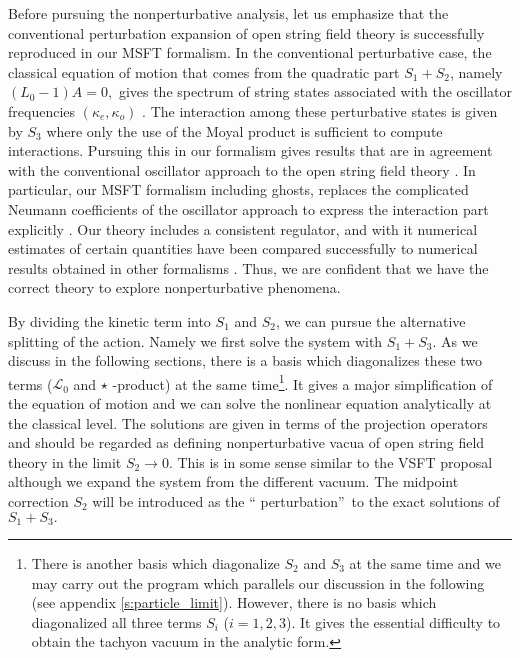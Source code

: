 \documentclass[a4paper,aps,preprint,nofootinbib,eqsecnum]{revtex4}
\begin{document}
Before pursuing the nonperturbative analysis, let us emphasize that the
conventional perturbation expansion of open string field theory is
successfully reproduced in our MSFT formalism. In the conventional
perturbative case, the classical equation of motion that comes from the
quadratic part $S_{1}+S_{2}$, namely $\left( L_{0}-1\right) A=0,$ gives the
spectrum of string states associated with the oscillator frequencies $%
(\kappa _{e},\kappa _{o})$ \cite{BM2}\cite{BKM1}. The interaction among
these perturbative states is given by $S_{3}$ where only the use of the
Moyal product is sufficient to compute interactions. Pursuing this in our
formalism gives results that are in agreement with the conventional
oscillator approach to the open string field theory \cite{GJ}. In
particular, our MSFT formalism including ghosts, replaces the complicated
Neumann coefficients of the oscillator approach to express the interaction
part explicitly \cite{BM2}\cite{PREP}. Our theory includes a consistent
regulator, and with it numerical estimates of certain quantities have been
compared successfully to numerical results obtained in other formalisms \cite%
{PREP}. Thus, we are confident that we have the correct theory to explore
nonperturbative phenomena.

By dividing the kinetic term into $S_{1}$ and $S_{2}$, we can pursue the
alternative splitting of the action. Namely we first solve the system with $%
S_{1}+S_{3}$. As we discuss in the following sections, there is a basis
which diagonalizes these two terms (${\mathcal{L}_{0}}$ and $\star $%
-product) at the same time\footnote{%
There is another basis which diagonalize $S_{2}$ and $S_{3}$ at the same
time and we may carry out the program which parallels our discussion in the
following (see appendix \ref{s:particle_limit}). However, there is no basis
which diagonalized all three terms $S_{i}$ ($i=1,2,3$). It gives the
essential difficulty to obtain the tachyon vacuum in the analytic form.}. It
gives a major simplification of the equation of motion and we can solve the
nonlinear equation analytically at the classical level. The solutions are
given in terms of the projection operators and should be regarded as
defining nonperturbative vacua of open string field theory in the limit $%
S_{2}\rightarrow 0$. This is in some sense similar to the VSFT proposal \cite%
{VSFT} although we expand the system from the different vacuum. The midpoint
correction $S_{2}$ will be introduced as the \textquotedblleft
perturbation\textquotedblright\ to the exact solutions of $S_{1}+S_{3}.$
\end{document}
